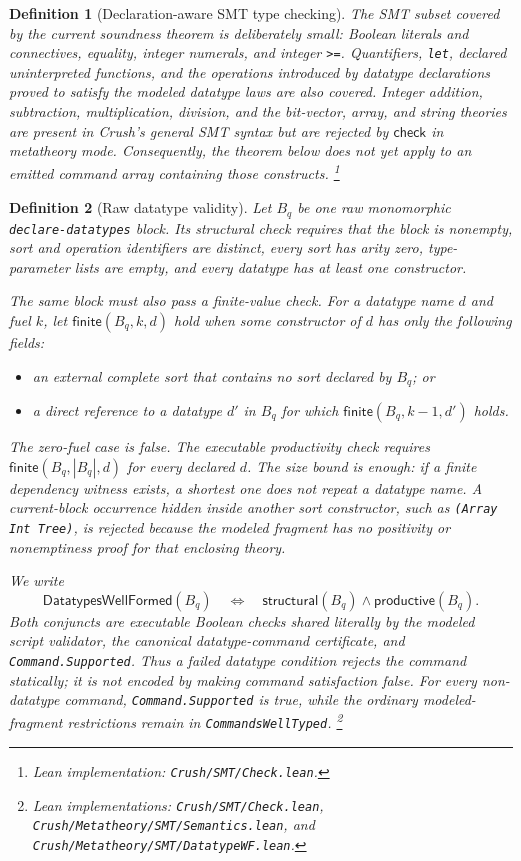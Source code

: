 \documentclass[11pt]{article}
\newtheorem{definition}{Definition}[section]
\theoremstyle{remark}
\begin{document}
\begin{definition}[Declaration-aware SMT type checking]
The SMT subset covered by the current soundness theorem is deliberately small:
Boolean literals and connectives, equality, integer numerals, and integer
\texttt{>=}. Quantifiers,
\texttt{let}, declared uninterpreted functions, and the operations introduced
by datatype declarations proved to satisfy the modeled datatype laws are also
covered. Integer addition,
subtraction, multiplication, division, and the bit-vector, array, and string
theories are present in Crush's general SMT syntax but are rejected by
$\mathsf{check}$ in metatheory mode. Consequently, the theorem below does not
yet apply to an emitted command array containing those constructs.
\footnote{Lean implementation: \texttt{Crush/SMT/Check.lean}.}
\end{definition}

\begin{definition}[Raw datatype validity]
Let $B_q$ be one raw monomorphic \texttt{declare-datatypes} block. Its
\emph{structural check} requires that the block is nonempty, sort and operation
identifiers are distinct, every sort has arity zero, type-parameter lists are
empty, and every datatype has at least one constructor.

The same block must also pass a finite-value check. For a datatype name $d$ and
fuel $k$, let $\mathsf{finite}(B_q,k,d)$ hold when some constructor of $d$ has
only the following fields:
\begin{itemize}[leftmargin=*]
 \item an external complete sort that contains no sort declared by $B_q$; or
 \item a direct reference to a datatype $d'$ in $B_q$ for which
       $\mathsf{finite}(B_q,k-1,d')$ holds.
\end{itemize}
The zero-fuel case is false. The executable productivity check requires
$\mathsf{finite}(B_q,|B_q|,d)$ for every declared $d$. The size bound is enough:
if a finite dependency witness exists, a shortest one does not repeat a
datatype name. A current-block occurrence hidden inside another sort
constructor, such as \texttt{(Array Int Tree)}, is rejected because the modeled
fragment has no positivity or nonemptiness proof for that enclosing theory.

We write
\[
 \mathsf{DatatypesWellFormed}(B_q)\quad\Longleftrightarrow\quad
 \mathsf{structural}(B_q)\land\mathsf{productive}(B_q).
\]
Both conjuncts are executable Boolean checks shared literally by the modeled
script validator, the canonical datatype-command certificate, and
\texttt{Command.Supported}. Thus a failed datatype condition rejects the
command statically; it is not encoded by making command satisfaction false.
For every non-datatype command, \texttt{Command.Supported} is true, while the
ordinary modeled-fragment restrictions remain in
\texttt{CommandsWellTyped}.
\footnote{Lean implementations: \texttt{Crush/SMT/Check.lean},
\texttt{Crush/Metatheory/SMT/Semantics.lean}, and
\texttt{Crush/Metatheory/SMT/DatatypeWF.lean}.}
\end{definition}
\end{document}
